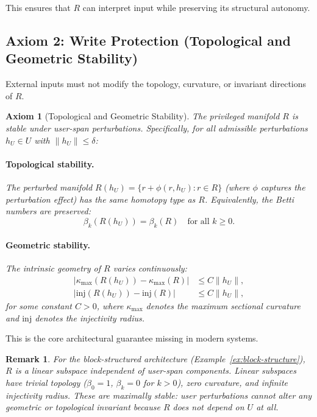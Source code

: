 \documentclass[11pt,a4paper]{article}
\newtheorem{axiom}{Axiom}
\newtheorem*{remark}{Remark}
\begin{document}
This ensures that $R$ can interpret input while preserving its structural autonomy.

\subsection{Axiom 2: Write Protection (Topological and Geometric Stability)}

External inputs must not modify the topology, curvature, or invariant directions of $R$.

\begin{axiom}[Topological and Geometric Stability]
\label{ax:topological-stability}
The privileged manifold $R$ is stable under user-span perturbations. Specifically, for all admissible perturbations $h_U \in U$ with $\|h_U\| \leq \delta$:

\paragraph{Topological stability.} The perturbed manifold $R(h_U) = \{r + \phi(r, h_U) : r \in R\}$ (where $\phi$ captures the perturbation effect) has the same homotopy type as $R$. Equivalently, the Betti numbers are preserved:
\[
\beta_k(R(h_U)) = \beta_k(R) \quad \text{for all } k \geq 0.
\]

\paragraph{Geometric stability.} The intrinsic geometry of $R$ varies continuously:
\begin{align*}
|\kappa_{\max}(R(h_U)) - \kappa_{\max}(R)| &\leq C \|h_U\|, \\
|\mathrm{inj}(R(h_U)) - \mathrm{inj}(R)| &\leq C \|h_U\|,
\end{align*}
for some constant $C > 0$, where $\kappa_{\max}$ denotes the maximum sectional curvature and $\mathrm{inj}$ denotes the injectivity radius.
\end{axiom}

This is the core architectural guarantee missing in modern systems.

\begin{remark}
For the block-structured architecture (Example~\ref{ex:block-structure}), $R$ is a linear subspace independent of user-span components. Linear subspaces have trivial topology ($\beta_0 = 1$, $\beta_k = 0$ for $k > 0$), zero curvature, and infinite injectivity radius. These are maximally stable: user perturbations cannot alter any geometric or topological invariant because $R$ does not depend on $U$ at all.
\end{remark}
\end{document}
